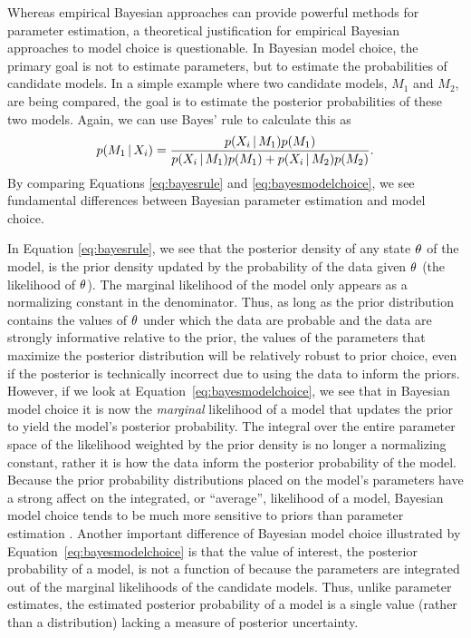 \begin{linenomath}
Whereas empirical Bayesian approaches can provide powerful methods for
parameter estimation, a theoretical justification for empirical Bayesian
approaches to model choice is questionable.
In Bayesian model choice, the primary goal is not to estimate parameters, but
to estimate the probabilities of candidate models.
In a simple example where two candidate models, $M_1$ and $M_2$, are being
compared, the goal is to estimate the posterior probabilities of these two
models.
Again, we can use Bayes' rule to calculate this as
\begin{equation}
    p(M_1 \given \alignment{i}{}) = \frac{p(\alignment{i}{} \given
    M_1)p(M_1)}{p(\alignment{i}{} \given M_1)p(M_1) + p(\alignment{i}{} \given
    M_2)p(M_2)}.
    \label{eq:bayesmodelchoice}
\end{equation}
By comparing Equations \ref{eq:bayesrule} and \ref{eq:bayesmodelchoice}, we
see fundamental differences between Bayesian parameter estimation and
model choice.
\end{linenomath}

In Equation \ref{eq:bayesrule}, we see that the posterior density of any state
$\theta_{}$ of the model, is the prior density updated by the probability of
the data given $\theta_{}$ (the likelihood of $\theta_{}$).
The marginal likelihood of the model only appears as a normalizing constant in
the denominator.
Thus, as long as the prior distribution contains the values of $\theta_{}$
under which the data are probable and the data are strongly informative
relative to the prior, the values of the parameters that maximize the posterior
distribution will be relatively robust to prior choice, even if the posterior
is technically incorrect due to using the data to inform the priors.
However, if we look at Equation~\ref{eq:bayesmodelchoice}, we see that in
Bayesian model choice it is now the \emph{marginal} likelihood of a model that
updates the prior to yield the model's posterior probability.
The integral over the entire parameter space of the likelihood weighted by the
prior density is no longer a normalizing constant, rather it is how the data
inform the posterior probability of the model.
Because the prior probability distributions placed on the model's parameters
have a strong affect on the integrated, or ``average'', likelihood of a model,
Bayesian model choice tends to be much more sensitive to priors than parameter
estimation \citep{Jeffreys1939,Lindley1957}.
Another important difference of Bayesian model choice illustrated by
Equation~\ref{eq:bayesmodelchoice} is that the value of interest, the posterior
probability of a model, is not a function of \myTheta{} because the parameters
are integrated out of the marginal likelihoods of the candidate models.
Thus, unlike parameter estimates, the estimated posterior probability of a
model is a single value (rather than a distribution) lacking a measure of
posterior uncertainty.

